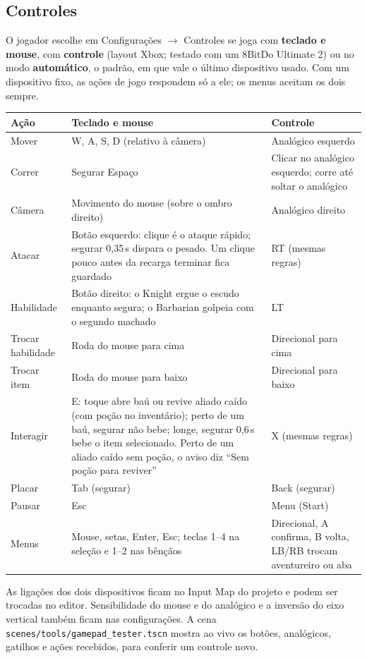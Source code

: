 \documentclass[11pt,a4paper]{article}
\begin{document}
\subsection{Controles}

O jogador escolhe em Configurações $\rightarrow$ Controles se joga com \textbf{teclado e mouse}, com \textbf{controle} (layout Xbox; testado com um 8BitDo Ultimate 2) ou no modo \textbf{automático}, o padrão, em que vale o último dispositivo usado. Com um dispositivo fixo, as ações de jogo respondem só a ele; os menus aceitam os dois sempre.

\begin{tabularx}{\textwidth}{@{}lXX@{}}
\toprule
\textbf{Ação} & \textbf{Teclado e mouse} & \textbf{Controle} \\
\midrule
Mover      & W, A, S, D (relativo à câmera) & Analógico esquerdo \\
Correr     & Segurar Espaço & Clicar no analógico esquerdo; corre até soltar o analógico \\
Câmera     & Movimento do mouse (sobre o ombro direito) & Analógico direito \\
Atacar     & Botão esquerdo: clique é o ataque rápido; segurar 0,35\,s dispara o pesado. Um clique pouco antes da recarga terminar fica guardado & RT (mesmas regras) \\
Habilidade & Botão direito: o Knight ergue o escudo enquanto segura; o Barbarian golpeia com o segundo machado & LT \\
Trocar habilidade & Roda do mouse para cima & Direcional para cima \\
Trocar item & Roda do mouse para baixo & Direcional para baixo \\
Interagir  & E: toque abre baú ou revive aliado caído (com poção no inventário); perto de um baú, segurar não bebe; longe, segurar 0,6\,s bebe o item selecionado. Perto de um aliado caído sem poção, o aviso diz ``Sem poção para reviver'' & X (mesmas regras) \\
Placar     & Tab (segurar) & Back (segurar) \\
Pausar     & Esc & Menu (Start) \\
Menus      & Mouse, setas, Enter, Esc; teclas 1--4 na seleção e 1--2 nas bênçãos & Direcional, A confirma, B volta, LB/RB trocam aventureiro ou aba \\
\bottomrule
\end{tabularx}

As ligações dos dois dispositivos ficam no Input Map do projeto e podem ser trocadas no editor. Sensibilidade do mouse e do analógico e a inversão do eixo vertical também ficam nas configurações. A cena \texttt{scenes/tools/gamepad\_tester.tscn} mostra ao vivo os botões, analógicos, gatilhos e ações recebidos, para conferir um controle novo.
\end{document}
